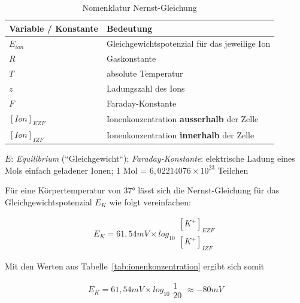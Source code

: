   {\renewcommand{\arraystretch}{1.5}%
\begin{table} %
\begin{center}
 \begin{tabular}{l |l }
  \textbf{Variable / Konstante} & \textbf{Bedeutung}  \\
  \hline
  $E_{ion}$            & Gleichgewichtspotenzial für das jeweilige Ion \\
  $R$                  & Gaskonstante \\
  $T$                  & absolute Temperatur \\
  $z$                  & Ladungszahl des Ions \\
  $F$                  & Faraday-Konstante \\
  $[Ion]_{EZF}$        & Ionenkonzentration \textbf{ausserhalb} der Zelle \\
  $[Ion]_{IZF}$        & Ionenkonzentration \textbf{innerhalb} der Zelle \\
 \end{tabular}
 \caption{Nomenklatur Nernst-Gleichung}
 \label{tab:nernstkonstanten}
\end{center}
 \small{
$E$: \textit{Equilibrium} (``Gleichgewicht``); \textit{Faraday-Konstante}: elektrische Ladung eines Mols einfach geladener Ionen; 1 Mol = $6,02214076 \times 10^{23}$ Teilchen

}

\end{table}

\noindent
Für eine Körpertemperatur von 37° lässt sich die Nernst-Gleichung für das Gleichgewichtspotenzial $E_K$ wie folgt vereinfachen:

\begin{equation}
 E_{K} = 61,54 mV  \times log_{10} \begin{matrix} [K^+]_{EZF} \\ \hline [K^+]_{IZF} \end{matrix}
 \label{eq:gl-nernst-reduced-start}
\end{equation}

\noindent
Mit den Werten aus Tabelle~\ref{tab:ionenkonzentration}  ergibt sich somit


\begin{equation}
E_{K} = 61,54 mV  \times log_{10} \begin{matrix} 1 \\ \hline 20 \end{matrix} \approx -80 mV
\label{eq:gl-nernst-reduced-end}
\end{equation}

}
